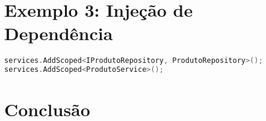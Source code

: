 \documentclass[12pt]{article}
\begin{document}
\vspace{0.5cm}

\section*{Exemplo 3: Injeção de Dependência}


\begin{lstlisting}[language=C,caption={Registo de dependências com injeção}]
services.AddScoped<IProdutoRepository, ProdutoRepository>();
services.AddScoped<ProdutoService>();
\end{lstlisting}

\vspace{0.5cm}

\section*{Conclusão}

\end{document}
